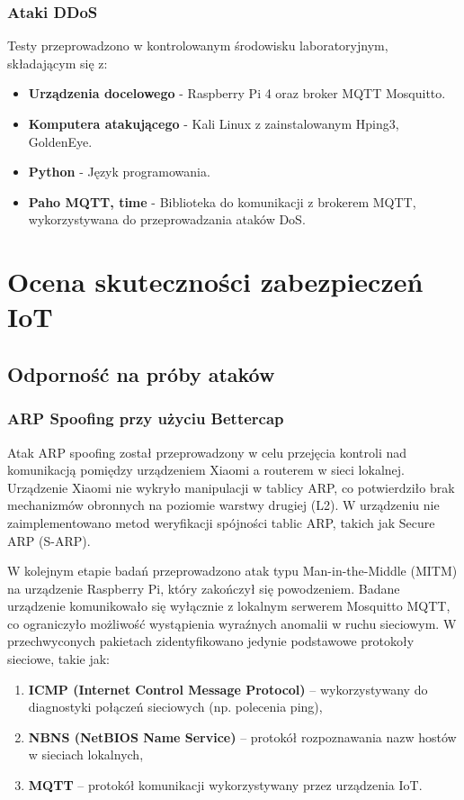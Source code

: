 \subsubsection{Ataki DDoS}
Testy przeprowadzono w kontrolowanym środowisku laboratoryjnym, składającym się z:
\begin{itemize}
    \item \textbf{Urządzenia docelowego} - Raspberry Pi 4 oraz broker MQTT Mosquitto.
    \item \textbf{Komputera atakującego} - Kali Linux z zainstalowanym Hping3, GoldenEye.
    \item \textbf{Python} - Język programowania.
    \item \textbf{Paho MQTT, time} - Biblioteka do komunikacji z brokerem MQTT, wykorzystywana do przeprowadzania ataków DoS.
\end{itemize}

\section{Ocena skuteczności zabezpieczeń IoT}
\subsection{Odporność na próby ataków}
\subsubsection{ARP Spoofing przy użyciu Bettercap}
Atak ARP spoofing został przeprowadzony w celu przejęcia kontroli nad komunikacją pomiędzy urządzeniem Xiaomi a routerem w sieci lokalnej. Urządzenie Xiaomi nie wykryło manipulacji w tablicy ARP, co potwierdziło brak mechanizmów obronnych na poziomie warstwy drugiej (L2). W urządzeniu nie zaimplementowano metod weryfikacji spójności tablic ARP, takich jak Secure ARP (S-ARP).

W kolejnym etapie badań przeprowadzono atak typu Man-in-the-Middle (MITM) na urządzenie Raspberry Pi, który zakończył się powodzeniem. Badane urządzenie komunikowało się wyłącznie z lokalnym serwerem Mosquitto MQTT, co ograniczyło możliwość wystąpienia wyraźnych anomalii w ruchu sieciowym. W przechwyconych pakietach zidentyfikowano jedynie podstawowe protokoły sieciowe, takie jak:
\begin{enumerate}
    \item \textbf{ICMP (Internet Control Message Protocol)} – wykorzystywany do diagnostyki połączeń sieciowych (np. polecenia ping),
    \item \textbf{NBNS (NetBIOS Name Service)} – protokół rozpoznawania nazw hostów w sieciach lokalnych,
    \item \textbf{MQTT} – protokół komunikacji wykorzystywany przez urządzenia IoT.
\end{enumerate}

